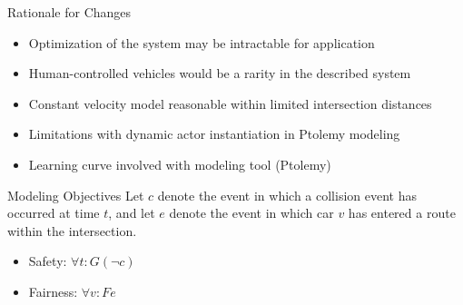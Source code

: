 \begin{frame}{Rationale for Changes}
\begin{itemize}
\item Optimization of the system may be intractable for application
\item Human-controlled vehicles would be a rarity in the described system
\item Constant velocity model reasonable within limited intersection distances
\item Limitations with dynamic actor instantiation in Ptolemy modeling
\item Learning curve involved with modeling tool (Ptolemy)
\end{itemize}
\end{frame}

\begin{frame}{Modeling Objectives}
Let $c$ denote the event in which a collision event has occurred at time $t$,
and let $e$ denote the event in which car $v$ has entered a route within
the intersection.
\begin{itemize}
\item Safety: $\forall t: G(\neg c)$
\item Fairness: $\forall v: F e$
\end{itemize}
\end{frame}
